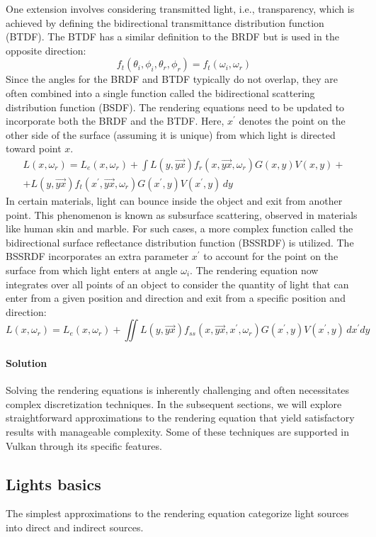 One extension involves considering transmitted light, i.e., transparency, which is achieved by defining the bidirectional transmittance distribution function (BTDF). 
The BTDF has a similar definition to the BRDF but is used in the opposite direction:
\[f_t(\theta_i,\phi_i,\theta_r,\phi_r)=f_t(\omega_i,\omega_r)\]
Since the angles for the BRDF and BTDF typically do not overlap, they are often combined into a single function called the bidirectional scattering distribution function (BSDF). 
The rendering equations need to be updated to incorporate both the BRDF and the BTDF.\@ 
Here, $x^\prime$ denotes the point on the other side of the surface (assuming it is unique) from which light is directed toward point $x$.
\begin{multline*}
    L(x,\omega_r)=L_e(x,\omega_r)+\int L(y,\overrightarrow{yx}) f_r(x,\overrightarrow{yx},\omega_r)G(x,y)V(x,y) + \\ + L(y,\overrightarrow{yx}) f_t(x^\prime,\overrightarrow{yx},\omega_r)G(x^\prime,y)V(x^\prime,y) \, dy
\end{multline*}
In certain materials, light can bounce inside the object and exit from another point. 
This phenomenon is known as subsurface scattering, observed in materials like human skin and marble.
For such cases, a more complex function called the bidirectional surface reflectance distribution function (BSSRDF) is utilized. 
The BSSRDF incorporates an extra parameter $x^\prime$ to account for the point on the surface from which light enters at angle $\omega_i$. 
The rendering equation now integrates over all points of an object to consider the quantity of light that can enter from a given position and direction and exit from a specific position and direction:
\[L(x,\omega_r)=L_e(x,\omega_r)+\iint L(y,\overrightarrow{yx}) f_{ss}(x,\overrightarrow{yx},x^\prime,\omega_r)G(x^\prime,y)V(x^\prime,y) \, dx^\prime dy\]

\paragraph*{Solution}
Solving the rendering equations is inherently challenging and often necessitates complex discretization techniques. 
In the subsequent sections, we will explore straightforward approximations to the rendering equation that yield satisfactory results with manageable complexity. 
Some of these techniques are supported in Vulkan through its specific features.

\subsection{Lights basics}
The simplest approximations to the rendering equation categorize light sources into direct and indirect sources.

